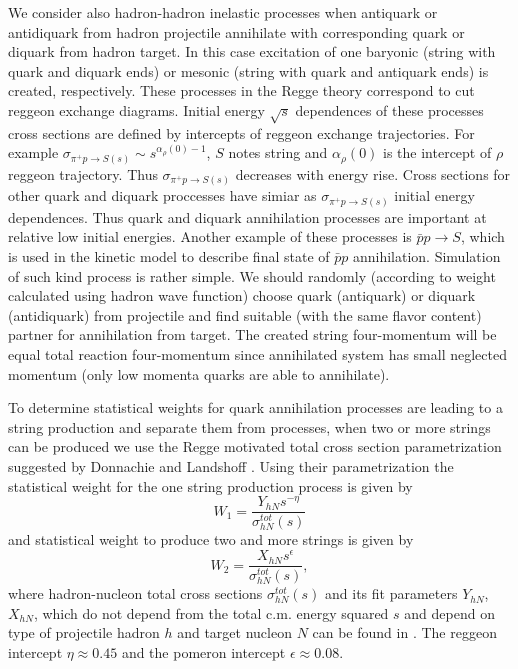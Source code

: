 \hspace{1.0em}
We consider also hadron-hadron inelastic processes when antiquark or 
antidiquark from hadron projectile annihilate with corresponding quark 
or diquark from hadron target.
In this case excitation of one baryonic (string with quark and diquark 
ends) or mesonic (string with quark and antiquark ends) is created, 
respectively. These processes in the Regge theory correspond to cut 
reggeon exchange diagrams. Initial energy $\sqrt{s}$ 
dependences of these processes 
cross sections are defined by  intercepts of reggeon exchange trajectories.
For example $\sigma_{\pi^{+}p\rightarrow S(s)} \sim s^{\alpha_{\rho}(0)-1}$, 
$S$ notes string and $\alpha_{\rho}(0)$ is the intercept of $\rho$ reggeon 
trajectory. Thus $\sigma_{\pi^{+}p\rightarrow S(s)}
$ decreases with energy 
rise. Cross sections for other quark and diquark proccesses have simiar 
as $\sigma_{\pi^{+}p\rightarrow S(s)}$ initial energy dependences. 
Thus quark and diquark annihilation processes are important at 
relative low initial energies. Another example of these processes is 
$\bar{p}p \rightarrow S$, which is used in the kinetic model to describe 
final state of $\bar{p}p$ annihilation.
Simulation of such kind process is rather simple. We should randomly 
(according to weight calculated using hadron wave function)
choose quark (antiquark) or diquark (antidiquark) from projectile and 
find suitable (with the same flavor content) partner for annihilation 
from target. The created string four-momentum will be equal total reaction 
four-momentum since annihilated system has small neglected momentum (only 
low momenta quarks are able to annihilate).
 
To determine statistical weights for 
 quark annihilation processes are leading to a string production 
and separate them from processes, when two or more strings can be produced we 
use the Regge motivated total cross section parametrization suggested by
Donnachie and Landshoff \cite{DL92}. Using their parametrization the
statistical weight for the one string production process is given by
\begin{equation}
\label{OSE1} W_{1} = \frac{Y_{hN}s^{-\eta}}{\sigma^{tot}_{hN}(s)}
\end{equation}
and statistical weight to produce two and more strings is given by 
\begin{equation}
\label{OSE2} W_{2} = \frac{X_{hN}s^{\epsilon}}{\sigma^{tot}_{hN}(s)},
\end{equation}
where hadron-nucleon total cross sections  $\sigma^{tot}_{hN}(s)$ and its 
fit parameters $Y_{hN}$, $X_{hN}$, which do not depend 
from the total c.m. energy squared $s$ and depend on type of
projectile hadron $h$ and target nucleon $N$ can be found in \cite{PDG96}. 
The reggeon intercept $\eta \approx 
0.45$ and the pomeron intercept $\epsilon \approx 0.08$.


